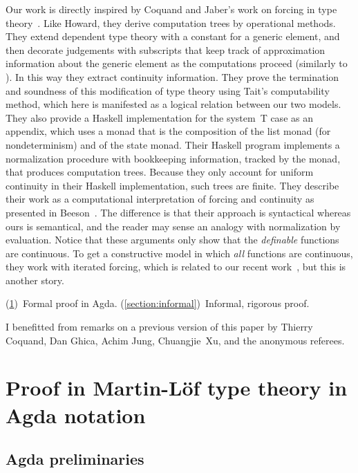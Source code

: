 \documentclass{entcs} \usepackage{prentcsmacro}
\begin{document}
Our work is directly inspired by Coquand and Jaber's work on forcing
in type
theory~\cite{Coquand:2010:NFT:1839560.1839564,DBLP:series/leus/CoquandJ12}. Like
Howard, they derive computation trees by operational methods. They
extend dependent type theory with a constant for a generic element,
and then decorate judgements with subscripts that keep track of
approximation information about the generic element as the
computations proceed (similarly to \cite{MR0325352}). 
In this way they extract continuity information. 
They prove the termination and soundness of this
modification of type theory using Tait's computability method, which
here is manifested as a logical relation between our two models. They
also provide a Haskell implementation for the system~T case as an
appendix, which uses a monad that is the composition of the list monad
(for nondeterminism) and of the state monad. Their Haskell program
implements a normalization procedure with bookkeeping information,
tracked by the monad, that produces computation trees. Because they
only account for uniform continuity in their Haskell implementation,
such trees are finite. They describe their work as a computational
interpretation of forcing and continuity as presented in
Beeson~\cite{beeson}. 
The difference is that 
their approach is syntactical whereas ours is semantical,
and the reader may sense an analogy with normalization by
evaluation. Notice that these arguments only show that the
\emph{definable} functions are continuous. To get a constructive model
in which \emph{all} functions are continuous, they work with iterated
forcing, which is related to our recent work~\cite{escardo:xu}, but
this is another story.

(\ref{section:formal})~Formal proof in Agda.
(\ref{section:informal})~Informal, rigorous proof.

  I benefitted from remarks on a
previous version of this paper by Thierry Coquand, Dan Ghica, Achim Jung,
Chuangjie~Xu, and the anonymous referees. 

\section{Proof in Martin-L\"of type theory in Agda notation}
\label{section:formal}

\subsection{Agda preliminaries} \label{section:preliminaries} 
\end{document}
